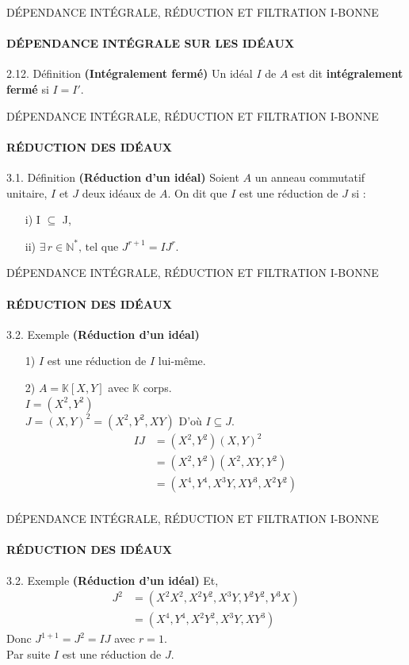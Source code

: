 \documentclass[11pt,a4paper]{beamer}
\begin{document}
\begin{frame}{DÉPENDANCE INTÉGRALE, RÉDUCTION ET FILTRATION I-BONNE}
	\framesubtitle{DÉPENDANCE INTÉGRALE SUR LES IDÉAUX}
	\begin{block}{2.12. Définition  \textbf{(Intégralement fermé)}}
	Un idéal $I$ de $A$ est dit \textbf{intégralement fermé} si $I = I'$.
	\end{block}
\end{frame}

\begin{frame}{DÉPENDANCE INTÉGRALE, RÉDUCTION ET FILTRATION I-BONNE}
	\framesubtitle{RÉDUCTION DES IDÉAUX}
	\begin{block}{3.1. Définition  \textbf{(Réduction d'un idéal)}}
		Soient $A$ un anneau commutatif unitaire, $I$ et $J$ deux id\'eaux de $A$.
		On dit que $I$ est une réduction de $J$ si :\\
		\begin{enumerate}
			\item[i)] I $\subseteq$ J, \pause
			\item[ii)] $\exists \, r\in \mathbb{N}^{*} \text{, tel que } J^{r+1} = IJ^{r}$.
		\end{enumerate}
	\end{block}
\end{frame}

\begin{frame}{DÉPENDANCE INTÉGRALE, RÉDUCTION ET FILTRATION I-BONNE}
	\framesubtitle{RÉDUCTION DES IDÉAUX}
	\begin{block}{3.2. Exemple  \textbf{(Réduction d'un idéal)}}
		\begin{enumerate}
			\item[1)] $I$ est une réduction de $I$ lui-même.
			\item[2)] $A =\mathbb{K}[X,Y]$ avec $\mathbb{K}$ corps.\\
			$I = (X^2, Y^2)$\\
			$J = (X,Y)^2 = (X^2, Y^2, XY) $ D'où $I \subseteq J$.
			\begin{align*}
				IJ&= (X^{2},Y^{2})(X,Y)^{2}\\
				&= (X^{2},Y^{2})(X^{2},XY,Y^{2})\\
				&= (X^{4},Y^{4},X^{3}Y,XY^{3},X^{2}Y^{2})\\
			\end{align*}
		\end{enumerate}
	\end{block}
\end{frame}

\begin{frame}{DÉPENDANCE INTÉGRALE, RÉDUCTION ET FILTRATION I-BONNE}
	\framesubtitle{RÉDUCTION DES IDÉAUX}
	\begin{block}{3.2. Exemple  \textbf{(Réduction d'un idéal)}}
			Et,
			\begin{align*}
				J^2 &= (X^2X^2, X^2Y^2, X^3Y, Y^2Y^2, Y^3X)\\
				&= (X^4, Y^4, X^2Y^2, X^3Y, XY^3)
			\end{align*}
			Donc $J^{1+1} = J^2 = IJ $ avec $r=1$.\\
			Par suite $I$ est une réduction de $J$.
	\end{block}
\end{frame}
\end{document}
